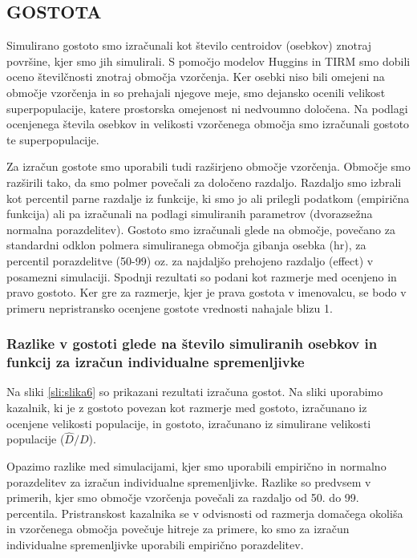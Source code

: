 \subsection{GOSTOTA}
Simulirano gostoto smo izračunali kot število centroidov (osebkov) znotraj površine, kjer smo jih simulirali. S pomočjo modelov Huggins in TIRM smo dobili oceno številčnosti znotraj območja vzorčenja. Ker osebki niso bili omejeni na območje vzorčenja in so prehajali njegove meje, smo dejansko ocenili velikost superpopulacije, katere prostorska omejenost ni nedvoumno določena. Na podlagi ocenjenega števila osebkov in velikosti vzorčenega območja smo izračunali gostoto te superpopulacije.

Za izračun gostote smo uporabili tudi razširjeno območje vzorčenja. Območje smo razširili tako, da smo polmer povečali za določeno razdaljo. Razdaljo smo izbrali kot percentil parne razdalje iz funkcije, ki smo jo ali prilegli podatkom (empirična funkcija) ali pa izračunali na podlagi simuliranih parametrov (dvorazsežna normalna porazdelitev). Gostoto smo izračunali glede na območje, povečano za standardni odklon polmera simuliranega območja gibanja osebka (hr), za percentil porazdelitve (50-99) oz. za najdaljšo prehojeno razdaljo (effect) v posamezni simulaciji. Spodnji rezultati so podani kot razmerje med ocenjeno in pravo gostoto. Ker gre za razmerje, kjer je prava gostota v imenovalcu, se bodo v primeru nepristransko ocenjene gostote vrednosti nahajale blizu 1.


\subsubsection[\bfseries Razlike v gostoti glede na število simuliranih osebkov in funkcij za izračun individualne spremenljivke]{Razlike v gostoti glede na število simuliranih osebkov in funkcij za izračun individualne spremenljivke}
Na sliki \ref{sli:slika6} so prikazani rezultati izračuna gostot. Na sliki uporabimo kazalnik, ki je z gostoto povezan kot razmerje med gostoto, izračunano iz ocenjene velikosti populacije, in gostoto, izračunano iz simulirane velikosti populacije ($\hat{D}/D$).

Opazimo razlike med simulacijami, kjer smo uporabili empirično in normalno porazdelitev za izračun individualne spremenljivke. Razlike so predvsem v primerih, kjer smo območje vzorčenja povečali za razdaljo od 50. do 99. percentila. Pristranskost kazalnika se v odvisnosti od razmerja domačega okoliša in vzorčenega območja povečuje hitreje za primere, ko smo za izračun individualne spremenljivke uporabili empirično porazdelitev.

